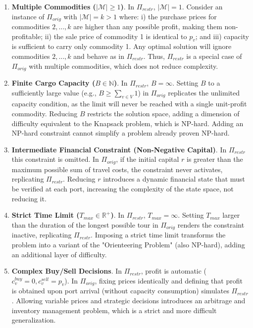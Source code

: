 \documentclass{article} \usepackage[english]{babel} \usepackage[utf8]{inputenc}
\begin{document}
\begin{enumerate} \item \textbf{Multiple Commodities ($|\mathcal{M}| \geq 1$)}.
In $\Pi_{restr}$, $|\mathcal{M}|=1$. Consider an instance of $\Pi_{orig}$ with
$|\mathcal{M}|=k>1$ where: i) the purchase prices for commodities $2, ..., k$
are higher than any possible profit, making them non-profitable; ii) the sale
price of commodity 1 is identical to $p_v$; and iii) capacity is sufficient to
carry only commodity 1. Any optimal solution will ignore commodities $2, ..., k$
and behave as in $\Pi_{restr}$. Thus, $\Pi_{restr}$ is a special case of
$\Pi_{orig}$ with multiple commodities, which does not reduce complexity.

\item \textbf{Finite Cargo Capacity ($B \in \mathbb{N}$)}. In $\Pi_{restr}$,
$B = \infty$. Setting $B$ to a sufficiently large value (e.g., $B \geq \sum_{v
\in V} 1$) in $\Pi_{orig}$ replicates the unlimited capacity condition, as the
limit will never be reached with a single unit-profit commodity. Reducing $B$
restricts the solution space, adding a dimension of difficulty equivalent to the
Knapsack problem, which is NP-hard. Adding an NP-hard constraint cannot simplify
a problem already proven NP-hard.

\item \textbf{Intermediate Financial Constraint (Non-Negative Capital)}. In
$\Pi_{restr}$ this constraint is omitted. In $\Pi_{orig}$, if the initial
capital $r$ is greater than the maximum possible sum of travel costs, the
constraint never activates, replicating $\Pi_{restr}$. Reducing $r$ introduces a
dynamic financial state that must be verified at each port, increasing the
complexity of the state space, not reducing it.

\item \textbf{Strict Time Limit ($T_{max} \in \mathbb{R}^+$)}. In
$\Pi_{restr}$, $T_{max} = \infty$. Setting $T_{max}$ larger than the duration of
the longest possible tour in $\Pi_{orig}$ renders the constraint inactive,
replicating $\Pi_{restr}$. Imposing a strict time limit transforms the problem
into a variant of the "Orienteering Problem" (also NP-hard), adding an
additional layer of difficulty.

\item \textbf{Complex Buy/Sell Decisions}. In $\Pi_{restr}$, profit is
automatic ($c^{buy}_v = 0, c^{sell}_v = p_v$). In $\Pi_{orig}$, fixing prices
identically and defining that profit is obtained upon port arrival (without
capacity consumption) simulates $\Pi_{restr}$. Allowing variable prices and
strategic decisions introduces an arbitrage and inventory management problem,
which is a strict and more difficult generalization. \end{enumerate}
\end{document}
